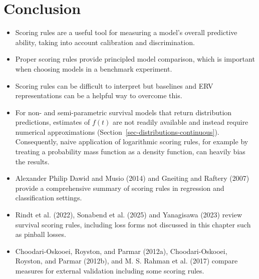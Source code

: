 \documentclass[
  letterpaper,
  krantz2]{style/krantz}
\providecommand{\tightlist}{%
  \setlength{\itemsep}{0pt}\setlength{\parskip}{0pt}}
\begin{document}
\section{Conclusion}\label{conclusion-6}

\begin{tcolorbox}[enhanced jigsaw, toprule=.15mm, bottomtitle=1mm, opacityback=0, breakable, leftrule=.75mm, title={Key takeaways}, toptitle=1mm, bottomrule=.15mm, colback=white, colframe=quarto-callout-warning-color-frame, titlerule=0mm, opacitybacktitle=0.6, coltitle=black, rightrule=.15mm, left=2mm, colbacktitle=quarto-callout-warning-color!10!white, arc=.35mm]

\begin{itemize}
\tightlist
\item
  Scoring rules are a useful tool for measuring a model's overall
  predictive ability, taking into account calibration and
  discrimination.
\item
  Proper scoring rules provide principled model comparison, which is
  important when choosing models in a benchmark experiment.
\item
  Scoring rules can be difficult to interpret but baselines and ERV
  representations can be a helpful way to overcome this.
\item
  For non- and semi-parametric survival models that return distribution
  predictions, estimates of \(f(t)\) are not readily available and
  instead require numerical approximations
  (Section~\ref{sec-distributions-continuous}). Consequently, naive
  application of logarithmic scoring rules, for example by treating a
  probability mass function as a density function, can heavily bias the
  results.
\end{itemize}

\end{tcolorbox}

\begin{tcolorbox}[enhanced jigsaw, toprule=.15mm, bottomtitle=1mm, opacityback=0, breakable, leftrule=.75mm, title={Further reading}, toptitle=1mm, bottomrule=.15mm, colback=white, colframe=quarto-callout-tip-color-frame, titlerule=0mm, opacitybacktitle=0.6, coltitle=black, rightrule=.15mm, left=2mm, colbacktitle=quarto-callout-tip-color!10!white, arc=.35mm]

\begin{itemize}
\tightlist
\item
  Alexander Philip Dawid and Musio (2014) and Gneiting and Raftery
  (2007) provide a comprehensive summary of scoring rules in regression
  and classification settings.
\item
  Rindt et al. (2022), Sonabend et al. (2025) and Yanagisawa (2023)
  review survival scoring rules, including loss forms not discussed in
  this chapter such as pinball losses.
\item
  Choodari-Oskooei, Royston, and Parmar (2012a), Choodari-Oskooei,
  Royston, and Parmar (2012b), and M. S. Rahman et al. (2017) compare
  measures for external validation including some scoring rules.
\end{itemize}

\end{tcolorbox}
\end{document}

